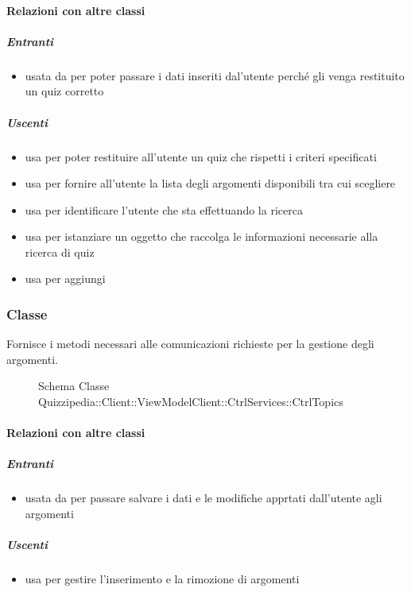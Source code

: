 \paragraph{Relazioni con altre classi}
\subparagraph{Entranti}
\begin{itemize}
\item usata da  per poter passare i dati inseriti dal'utente perché gli venga restituito un quiz corretto
\end{itemize}
\subparagraph{Uscenti}
\begin{itemize}
\item usa  per poter restituire all'utente un quiz che rispetti i criteri specificati
\item usa  per fornire all'utente la lista degli argomenti disponibili tra cui scegliere
\item usa  per identificare l'utente che sta effettuando la ricerca
\item usa  per istanziare un oggetto che raccolga le informazioni necessarie alla ricerca di quiz
\item usa  per aggiungi
\end{itemize}
\subsubsection{Classe }
Fornisce i metodi necessari alle comunicazioni richieste per la gestione degli argomenti.
\begin{figure}[H]
\centering
\noindent{}
\caption[Schema Classe CtrlTopics]{Schema Classe Quizzipedia::Client::ViewModelClient::CtrlServices::CtrlTopics}
\end{figure}
\paragraph{Relazioni con altre classi}
\subparagraph{Entranti}
\begin{itemize}
\item usata da  per passare salvare i dati e le modifiche apprtati dall'utente agli argomenti
\end{itemize}
\subparagraph{Uscenti}
\begin{itemize}
\item usa  per gestire l'inserimento e la rimozione di argomenti
\end{itemize}
